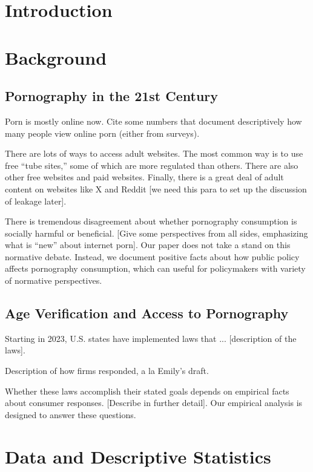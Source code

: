 \clearpage
{} 
 
\section{Introduction}

\section{Background}

\subsection{Pornography in the 21st Century}

Porn is mostly online now. Cite some numbers that document descriptively how many people view online porn (either from surveys).

There are lots of ways to access adult websites. The most common way is to use free ``tube sites,'' some of which are more regulated than others. There are also other free websites and paid websites. Finally, there is a great deal of adult content on websites like X and Reddit [we need this para to set up the discussion of leakage later].

There is tremendous disagreement about whether pornography consumption is socially harmful or beneficial. [Give some perspectives from all sides, emphasizing what is ``new'' about internet porn]. Our paper does not take a stand on this normative debate. Instead, we document positive facts about how public policy affects pornography consumption, which can useful for policymakers with variety of normative perspectives.

\subsection{Age Verification and Access to Pornography}

Starting in 2023, U.S. states have implemented laws that ... [description of the laws].

Description of how firms responded, a la Emily's draft.

Whether these laws accomplish their stated goals depends on empirical facts about consumer responses. [Describe in further detail]. Our empirical analysis is designed to answer these questions.

\section{Data and Descriptive Statistics}

